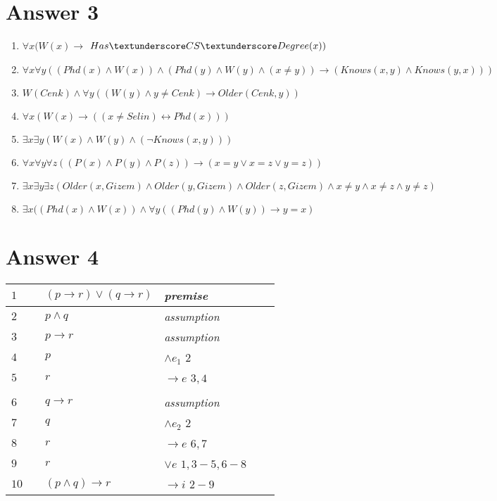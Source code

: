 \documentclass[12pt]{article}
\begin{document}
\section*{Answer 3}
\begin{enumerate}
	\item $\forall x(W(x) \to$ $ Has\textunderscore CS\textunderscore Degree(x))$
	\item $\forall x \forall y((Phd(x)\land W(x))\land(Phd(y)\land W(y)\land (x \neq y)) \to (Knows(x,y) \land Knows(y,x)))$
	\item $ W(Cenk) \land \forall y ((W(y) \land  y \neq Cenk ) \to Older(Cenk,y))$
	\item $\forall x(W(x) \to ((x \neq Selin) \leftrightarrow Phd(x)))$
	\item $\exists x \exists y(W(x) \land W(y) \land (\neg Knows(x,y)))$
	\item $\forall x \forall y \forall z ((P(x)\land P(y)\land P(z))\to (x=y\lor x=z \lor y=z)) $
	\item $\exists x \exists y \exists z ( Older(x,Gizem) \land Older(y,Gizem) \land Older(z,Gizem) \land x\neq y \land x \neq z \land y \neq z )$
	\item $\exists x((Phd(x) \land W(x)) \land \forall y((Phd(y)\land W(y)) \to y = x) $
\end{enumerate}
\section*{Answer 4}
\begin{table}[H]
	\centering
\begin{tabular}{*6{l}}
	$1$ & &  $(p \to r) \lor (q \to r) $ & \textit{premise} & \\ \hline \hline
	
	$2$ & &  $p \land q$ &\textit{assumption} & \\  \hline
	
	$3$ & &  $p \to r$ &  \textit{assumption} & \\ 
	
	$4$ & &  $p$ & $\land e_1$ $2$ & \\ 
	
	$5$ & &  $r$& $\to e$ $3,4$ \\ \hline
	
	& & & & \\ \hline
	
	$6$ & &  $q \to r $ & \textit{assumption} & \\
	
	$7$ & & $q$ & $\land e_2$ $2$ & \\
	
	$8$ & &  $r$ & $\to e$ $6,7$ \\ \hline
	
	$9$ & &  $r$ & $\lor e$ $1, 3-5, 6-8$ & \\ \hline \hline
	
	$10$ & &  $(p \land q ) \to r$ & $\to i$ $2-9$ & \\
	
\end{tabular}
\end{table}
\end{document}
